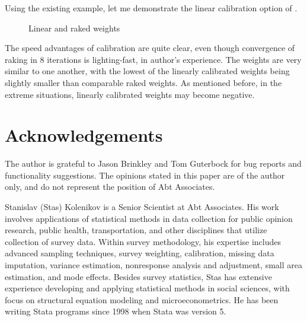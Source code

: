 Using the existing example, let me demonstrate the linear calibration option of 
.

\begin{stlog}
\nullskip
\end{stlog}

\begin{figure}[h!]
    \begin{center}
    \end{center}
    \caption{Linear and raked weights}
    \label{fig:linear:raked}
\end{figure}

The speed advantages of  calibration are quite clear, even though
convergence of raking in 8 iterations is lighting-fast, in author's experience. 
The weights are very similar to one another, with the lowest of the linearly
calibrated weights being slightly smaller than comparable raked weights.
As mentioned before, in the extreme situations, linearly calibrated weights
may become negative.


















\section*{Acknowledgements}

The author is grateful to Jason Brinkley and Tom Guterbock for bug reports and 
functionality suggestions.
The opinions stated in this paper
are of the author only, and do not represent the position of Abt Associates.



% 

\begin{aboutauthor}
  Stanislav (Stas) Kolenikov is a Senior Scientist at Abt Associates.
  His work involves applications of statistical methods in data collection
  for public opinion research, public health, transportation, and other disciplines
  that utilize collection of survey data.
  Within survey methodology, his expertise includes advanced sampling techniques,
  survey weighting, calibration, missing data imputation, variance estimation,
  nonresponse analysis and adjustment, small area estimation, and mode effects.
  Besides survey statistics, Stas has extensive experience developing and applying
  statistical methods in social sciences, with focus on structural equation
  modeling and microeconometrics. He has been writing Stata programs since
  1998 when Stata was version 5.
\end{aboutauthor}
